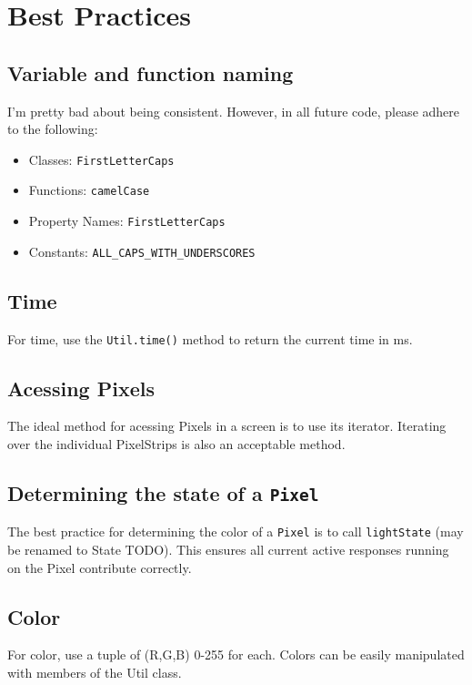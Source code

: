 \documentclass{article}
\begin{document}
    \section{Best Practices}
        \subsection{Variable and function naming}
            I'm pretty bad about being consistent.  However, in all future
            code, please adhere to the following:
            \begin{itemize}
                \item Classes: \texttt{FirstLetterCaps}
                \item Functions: \texttt{camelCase}
                \item Property Names: \texttt{FirstLetterCaps}
                \item Constants: \texttt{ALL\_CAPS\_WITH\_UNDERSCORES}
            \end{itemize}
        \subsection{Time}
            For time, use the \texttt{Util.time()} method to return the current
            time in ms.
        \subsection{Acessing Pixels}
            The ideal method for acessing Pixels in a screen is to use its
            iterator.  Iterating over the individual PixelStrips is also an
            acceptable method.  
        \subsection{Determining the state of a \texttt{Pixel}}
            The best practice for determining the color of a \texttt{Pixel} is to call
            \texttt{lightState} (may be renamed to State TODO).  This ensures
            all current active responses running on the Pixel contribute correctly. 
        \subsection{Color}
            For color, use a tuple of (R,G,B) 0-255 for each.  Colors can be
            easily manipulated with members of the Util class.
    
\end{document}
